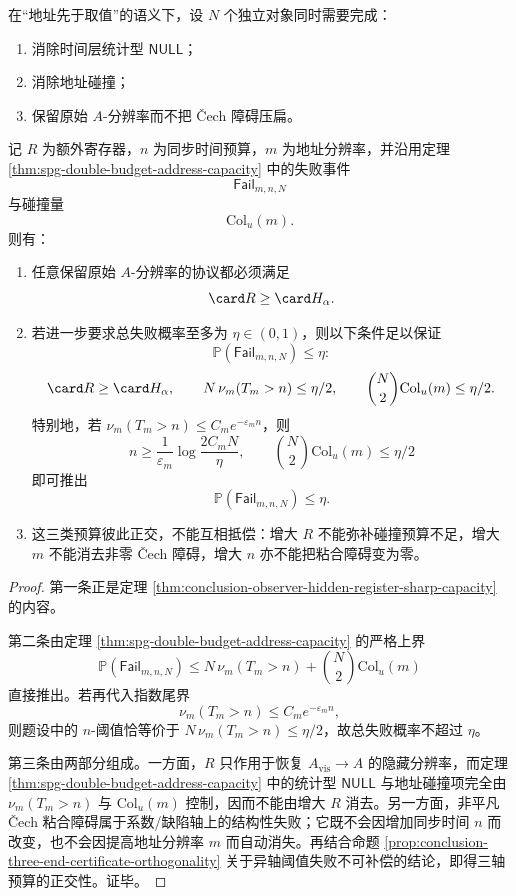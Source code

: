\begin{theorem}[全地址协议的三轴张量预算律]\label{thm:conclusion-observer-address-protocol-three-axis-budget-law}
在“地址先于取值”的语义下，设 \(N\) 个独立对象同时需要完成：
\begin{enumerate}
  \item 消除时间层统计型 \(\mathsf{NULL}\)；
  \item 消除地址碰撞；
  \item 保留原始 \(A\)-分辨率而不把 Čech 障碍压扁。
\end{enumerate}
记 \(R\) 为额外寄存器，\(n\) 为同步时间预算，\(m\) 为地址分辨率，并沿用定理 \ref{thm:spg-double-budget-address-capacity} 中的失败事件
\[
\mathsf{Fail}_{m,n,N}
\]
与碰撞量
\[
\mathrm{Col}_u(m).
\]
则有：
\begin{enumerate}
  \item 任意保留原始 \(A\)-分辨率的协议都必须满足
  \[
  \card R\ge \card H_\alpha.
  \]
  \item 若进一步要求总失败概率至多为 \(\eta\in(0,1)\)，则以下条件足以保证
  \[
  \mathbb P(\mathsf{Fail}_{m,n,N})\le \eta:
  \]
  \[
  \card R\ge \card H_\alpha,
  \qquad
  N\,\nu_m(T_m>n)\le \eta/2,
  \qquad
  \binom{N}{2}\mathrm{Col}_u(m)\le \eta/2.
  \]
  特别地，若 \(\nu_m(T_m>n)\le C_m e^{-\varepsilon_m n}\)，则
  \[
  n\ge \frac{1}{\varepsilon_m}\log\frac{2C_mN}{\eta},
  \qquad
  \binom{N}{2}\mathrm{Col}_u(m)\le \eta/2
  \]
  即可推出
  \[
  \mathbb P(\mathsf{Fail}_{m,n,N})\le \eta.
  \]
  \item 这三类预算彼此正交，不能互相抵偿：增大 \(R\) 不能弥补碰撞预算不足，增大 \(m\) 不能消去非零 Čech 障碍，增大 \(n\) 亦不能把粘合障碍变为零。
\end{enumerate}
\end{theorem}
\begin{proof}
第一条正是定理 \ref{thm:conclusion-observer-hidden-register-sharp-capacity} 的内容。

第二条由定理 \ref{thm:spg-double-budget-address-capacity} 的严格上界
\[
\mathbb{P}(\mathsf{Fail}_{m,n,N})
\le
N\,\nu_m(T_m>n)+\binom{N}{2}\mathrm{Col}_u(m)
\]
直接推出。若再代入指数尾界
\[
\nu_m(T_m>n)\le C_m e^{-\varepsilon_m n},
\]
则题设中的 \(n\)-阈值恰等价于 \(N\,\nu_m(T_m>n)\le \eta/2\)，故总失败概率不超过 \(\eta\)。

第三条由两部分组成。一方面，\(R\) 只作用于恢复 \(A_{\mathrm{vis}}\to A\) 的隐藏分辨率，而定理 \ref{thm:spg-double-budget-address-capacity} 中的统计型 \(\mathsf{NULL}\) 与地址碰撞项完全由 \(\nu_m(T_m>n)\) 与 \(\mathrm{Col}_u(m)\) 控制，因而不能由增大 \(R\) 消去。另一方面，非平凡 Čech 粘合障碍属于系数/缺陷轴上的结构性失败；它既不会因增加同步时间 \(n\) 而改变，也不会因提高地址分辨率 \(m\) 而自动消失。再结合命题 \ref{prop:conclusion-three-end-certificate-orthogonality} 关于异轴阈值失败不可补偿的结论，即得三轴预算的正交性。证毕。
\end{proof}

